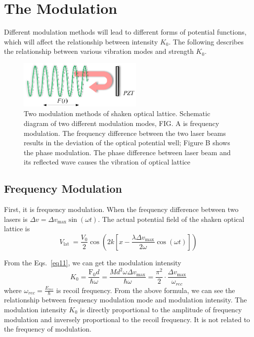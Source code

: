 \documentclass[
 reprint,
 amsmath,amssymb,
 aps,
pra,
floatfix,
]{revtex4-2}
\begin{document}
\section{The Modulation}

Different modulation methods will lead to different forms of potential functions, %
which will affect the relationship between intensity $K_{0}$. 
The following describes the relationship between various vibration modes and strength $K_{0}$.
\begin{figure}[b]
  \includegraphics[width = 6cm]{fig3.eps}
  \caption{\label{fig3} Two modulation methods of shaken optical lattice.
  Schematic diagram of two different modulation modes, FIG. A is frequency modulation. 
  The frequency difference between the two laser beams results in the deviation of the optical potential well; 
  Figure B shows the phase modulation. The phase difference between laser beam and its reflected wave causes the vibration of optical lattice}
\end{figure}

\subsection{Frequency Modulation}
First, it is frequency modulation.%
When the frequency difference between two lasers is $\Delta v=\Delta v_{\max } \sin (\omega t)$.
The actual potential field of the shaken optical lattice is
\begin{equation}
  V_{\text {lat }}=\frac{V_{0}}{2} \cos \left(2 k\left[x-\frac{\lambda \Delta v_{\max }}{2 \omega} \cos (\omega t)\right]\right)
  \label{eq11}
\end{equation}

From the Eqs.~\ref{eq11}, we can get the modulation intensity
\begin{equation}
  K_{0}=\frac{\mathrm{F}_{0} d}{\hbar \omega}=\frac{M d^{2} \omega \Delta v_{\max }}{\hbar \omega}=\frac{\pi^{2}}{2} \cdot \frac{\Delta v_{\max }}{\omega_{r e c}}
\end{equation}
where $\omega_{r e c}=\frac{E_{r e c}}{\hbar}$ is recoil frequency.
From the above formula, we can see the relationship between frequency modulation mode and modulation intensity. 
The modulation intensity $K_{0}$ is directly proportional to the amplitude of frequency modulation and inversely proportional to the recoil frequency. 
It is not related to the frequency of modulation. 
\end{document}
